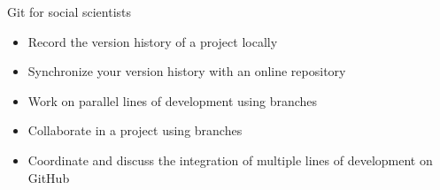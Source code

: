 \documentclass[handout]{beamer}
\begin{document}
\begin{frame}{Git for social scientists}
\begin{itemize}
	\item Record the version history of a project locally
	\item Synchronize your version history with an online repository
	\item Work on parallel lines of development using branches
	\item Collaborate in a project using branches
	\item Coordinate and discuss the integration of multiple lines of development on GitHub
\end{itemize}
\end{frame}
\end{document}
